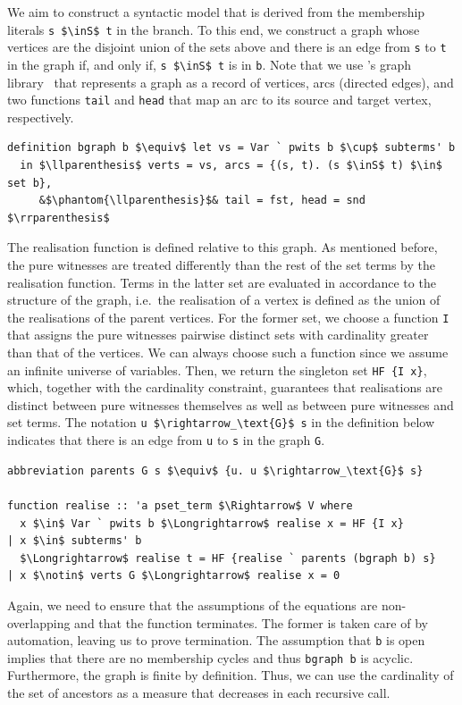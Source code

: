 \documentclass[runningheads]{llncs}
\newcommand{\inS}{\in_\text{s}}
\begin{document}
We aim to construct a syntactic model that is derived from the membership literals \lstinline!s $\inS$ t! in the branch.
To this end, we construct a graph whose vertices are the disjoint union of the sets above and there is an edge from \lstinline!s! to \lstinline!t! in the graph if, and only if, \lstinline!s $\inS$ t! is in \lstinline!b!.
Note that we use \citeauthor{graph_theory_afp}'s graph library~\cite{graph_theory_afp} that represents a graph as a record of vertices, arcs (directed edges), and two functions \lstinline!tail! and \lstinline!head! that map an arc to its source and target vertex, respectively.
\begin{lstlisting}
definition bgraph b $\equiv$ let vs = Var ` pwits b $\cup$ subterms' b
  in $\llparenthesis$ verts = vs, arcs = {(s, t). (s $\inS$ t) $\in$ set b},
     &$\phantom{\llparenthesis}$& tail = fst, head = snd $\rrparenthesis$
\end{lstlisting}

The realisation function is defined relative to this graph.
As mentioned before, the pure witnesses are treated differently than the rest of the set terms by the realisation function.
Terms in the latter set are evaluated in accordance to the structure of the graph, i.e.\ the realisation of a vertex is defined as the union of the realisations of the parent vertices. 
For the former set, we choose a function \lstinline!I! that assigns the pure witnesses pairwise distinct sets with cardinality greater than that of the vertices.
We can always choose such a function since we assume an infinite universe of variables.
Then, we return the singleton set \lstinline!HF {I x}!, which, together with the cardinality constraint, guarantees that realisations are distinct between pure witnesses themselves as well as between pure witnesses and set terms.  
The notation \lstinline!u $\rightarrow_\text{G}$ s! in the definition below indicates that there is an edge from \lstinline!u! to \lstinline!s! in the graph \lstinline!G!.
\begin{lstlisting}
abbreviation parents G s $\equiv$ {u. u $\rightarrow_\text{G}$ s}

function realise :: 'a pset_term $\Rightarrow$ V where
  x $\in$ Var ` pwits b $\Longrightarrow$ realise x = HF {I x}
| x $\in$ subterms' b
  $\Longrightarrow$ realise t = HF {realise ` parents (bgraph b) s}
| x $\notin$ verts G $\Longrightarrow$ realise x = 0
\end{lstlisting}

Again, we need to ensure that the assumptions of the equations are non-overlapping and that the function terminates.
The former is taken care of by automation, leaving us to prove termination.
The assumption that \lstinline!b! is open implies that there are no membership cycles and thus \lstinline!bgraph b! is acyclic.
Furthermore, the graph is finite by definition.
Thus, we can use the cardinality of the set of ancestors as a measure that decreases in each recursive call.
\end{document}
